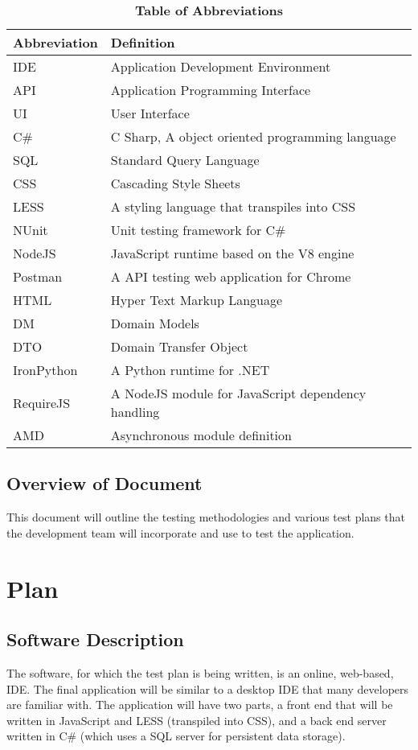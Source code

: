 \documentclass[12pt, titlepage]{article}
\begin{document}
    \begin{table}[hbp]
    \caption{\textbf{Table of Abbreviations}} \label{Table}

    \begin{tabularx}{\textwidth}{p{3cm}X}
    \toprule
    \textbf{Abbreviation} & \textbf{Definition} \\
    \midrule
      IDE & Application Development Environment\\
      API & Application Programming Interface\\
      UI & User Interface\\
      C\# & C Sharp, A object oriented programming language\\
      SQL & Standard Query Language\\
      CSS & Cascading Style Sheets\\
      LESS & A styling language that transpiles into CSS\\
      NUnit & Unit testing framework for C\#\\
      NodeJS & JavaScript runtime based on the V8 engine\\
      Postman & A API testing web application for Chrome\\
      HTML & Hyper Text Markup Language\\
      DM & Domain Models\\
      DTO & Domain Transfer Object\\
      IronPython & A Python runtime for .NET\\
      RequireJS & A NodeJS module for JavaScript dependency handling\\
      AMD & Asynchronous module definition\\
    \bottomrule
    \end{tabularx}

    \end{table}

    \subsection{Overview of Document}
    This document will outline the testing methodologies and various test plans
    that the development team will incorporate and use to test the application.

\section{Plan}
	
    \subsection{Software Description}
    The software, for which the test plan is being written, is an online, web-based,
    IDE. The final application will be similar to a
    desktop IDE that many developers are familiar with. The application will have
    two parts, a front end that will be written in JavaScript and LESS (transpiled
    into CSS), and a back end server written in C\# (which uses a SQL server for
    persistent data storage).
\end{document}
